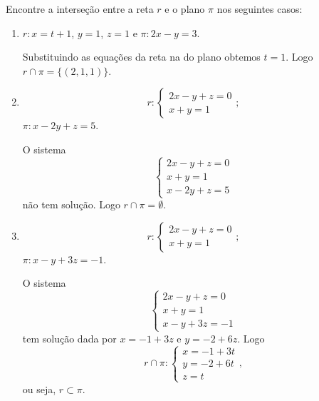 \begin{exemplos}
    Encontre a interse\c{c}\~ao entre a reta $r$ e o plano $\pi$ nos seguintes casos:
    \begin{enumerate}
        \item $r: x = t + 1$, $y = 1$, $z = 1$ e $\pi : 2x - y = 3$.
        \begin{solucao}
            Substituindo as equa\c{c}\~oes da reta na do plano obtemos $t = 1$. Logo $r\cap\pi = \{(2,1,1)\}$.
        \end{solucao}
        \item
        \[
            r: \begin{cases}
                2x - y + z = 0\\
                x + y = 1
            \end{cases};
        \]
        $\pi : x - 2y + z = 5$.
        \begin{solucao}
            O sistema
            \[
                \begin{cases}
                    2x - y + z = 0\\
                    x + y = 1\\
                    x - 2y + z = 5
                \end{cases}
            \]
            n\~ao tem solu\c{c}\~ao. Logo $r\cap\pi = \emptyset$.
        \end{solucao}
        \item
        \[
            r: \begin{cases}
                2x - y + z = 0\\
                x + y = 1
            \end{cases};
        \]
        $\pi : x - y + 3z = -1$.
        \begin{solucao}
            O sistema
            \[
                \begin{cases}
                    2x - y + z = 0\\
                    x + y = 1\\
                    x - y + 3z = -1
                \end{cases}
            \]
            tem solu\c{c}\~ao dada por $x = -1 + 3z$ e $y = -2 + 6z$. Logo 
            \[
            r\cap\pi : \begin{cases}
                x = -1 + 3t\\
                y = -2 + 6t\\
                z = t
            \end{cases},
            \]
            ou seja, $r \subset \pi$.
        \end{solucao}
    \end{enumerate}
\end{exemplos}

